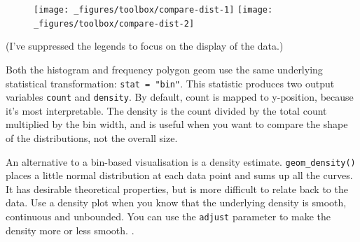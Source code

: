 \begin{figure}[H]
  \texttt{[image: \_figures/toolbox/compare-dist-1]}%
  \texttt{[image: \_figures/toolbox/compare-dist-2]}
\end{figure}

(I've suppressed the legends to focus on the display of the data.)

Both the histogram and frequency polygon geom use the same underlying
statistical transformation: \texttt{stat\ =\ "bin"}. This statistic
produces two output variables \texttt{count} and \texttt{density}. By
default, count is mapped to y-position, because it's most interpretable.
The density is the count divided by the total count multiplied by the
bin width, and is useful when you want to compare the shape of the
distributions, not the overall size. 

An alternative to a bin-based visualisation is a density estimate.
\texttt{geom\_density()} places a little normal distribution at each
data point and sums up all the curves. It has desirable theoretical
properties, but is more difficult to relate back to the data. Use a
density plot when you know that the underlying density is smooth,
continuous and unbounded. You can use the \texttt{adjust} parameter to
make the density more or less smooth. 
.

\begin{Shaded}
\begin{Highlighting}[]
\StringTok{  }\NormalTok{(} \NormalTok{) +}\StringTok{ }
\StringTok{  }\NormalTok{(}\NormalTok{, }\NormalTok{) +}\StringTok{ }
\StringTok{  }\NormalTok{(} \NormalTok{)}
  
\StringTok{  }\NormalTok{(} \NormalTok{, } \NormalTok{) +}\StringTok{ }
\StringTok{  }\NormalTok{(}\NormalTok{, }\NormalTok{) +}\StringTok{ }
\StringTok{  }\NormalTok{(} \NormalTok{)}
\end{Highlighting}
\end{Shaded}

